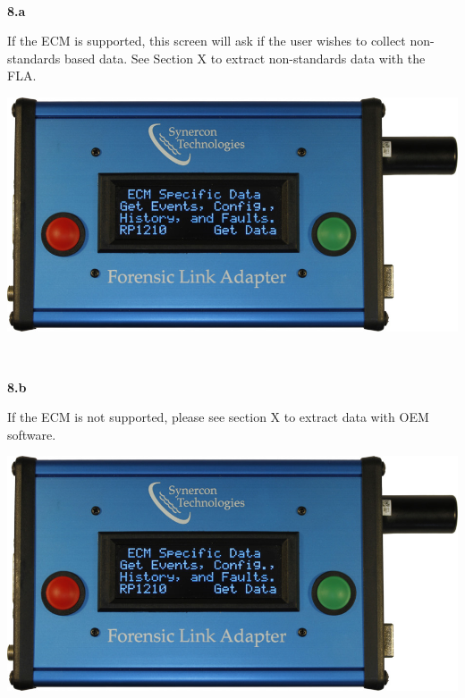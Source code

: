 \documentclass[11pt, oneside]{book}
\begin{document}
\\[\baselineskip]
\noindent\begin{minipage}{0.45\textwidth}%
\begin{center}
\textbf{8.a}\\[\baselineskip]
\end{center}
If the ECM is supported, this screen will ask if the user wishes to collect non-standards based data. See Section X to extract non-standards data with the FLA.
\end{minipage}%
\hfill%
\begin{minipage}{0.45\textwidth}
\includegraphics[width=\linewidth]{../media/fla_screens/ethernet_and_others/veh_scan/get_ecm_specific}
\end{minipage}
\\[\baselineskip]
\noindent\begin{minipage}{0.45\textwidth}%
\begin{center}
\textbf{8.b}\\[\baselineskip]
\end{center}
If the ECM is not supported, please see section X to extract data with OEM software.
\end{minipage}%
\hfill%
\begin{minipage}{0.45\textwidth}
\includegraphics[width=\linewidth]{../media/fla_screens/ethernet_and_others/veh_scan/get_ecm_specific}
\end{minipage}
\end{document}
